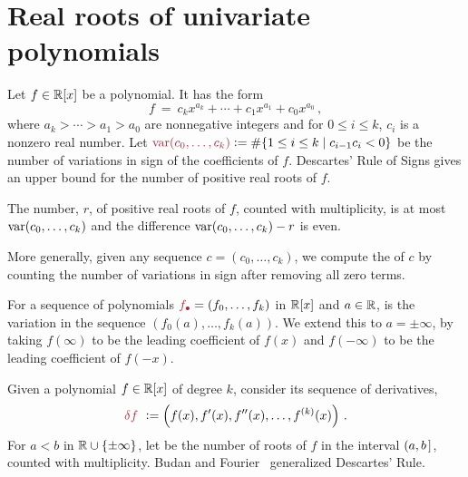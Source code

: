 
\section{Real roots of univariate polynomials}\label{S:one}

Let $f\in\mathbb{R}[x]$ be a polynomial.
It has the form
%
 \[
   f\ =\ c_kx^{a_k}  + \dotsb + c_{1}x^{a_{1}} + c_0x^{a_0}\,,
 \]
%
where $a_k> \dotsb > a_1 > a_0$ are nonnegative integers and for $0\leq i \leq k$, $c_{i}$ is a nonzero real number.
Let $\defcolor{\var(c_0,\dotsc,c_k)}\vcentcolon=\#\{1\leq i\leq k\mid c_{i-1}c_i<0\}$ be the number of variations in sign of the
coefficients of $f$.
Descartes' Rule of Signs \cite{So_Book} gives an upper bound for the number of positive real roots of $f$.

\begin{theorem}
  The number, $r$,  of positive real roots of $f$, counted with multiplicity, is at most $\operatorname{{\rm var}}(c_0,\dotsc,c_k)$ and the difference
  $\operatorname{{\rm var}}(c_0,\dotsc,c_k)-r$ is even.
\end{theorem}

More generally, given any sequence $c=(c_0,\dotsc,c_k)$, we compute the    of $c$ by counting the
number of variations in sign after removing all zero terms.
%
\begin{leftbar}

\end{leftbar}
%
For a sequence of polynomials  $\defcolor{f_\bullet}=(f_0,\dotsc,f_k)$ in $\mathbb{R}[x]$ and $a\in\mathbb{R}$,  is the
variation in the sequence 
$(f_0(a),\dotsc,f_{k}(a))$. 
We extend this to $a=\pm\infty$, by taking $f(\infty)$ to be the leading coefficient of $f(x)$ and $f(-\infty)$ to be the leading
coefficient of $f(-x)$.

Given a polynomial $f\in\mathbb{R}[x]$ of degree $k$, consider its sequence of derivatives,
%
 \[
   \defcolor{\delta f}\ \vcentcolon= \left(f(x),f'(x),f''(x),\dots,f^{(k)}(x)\right)\,.
 \]
%
For $a<b$ in $\mathbb{R}\cup\{\pm \infty\}$, let  be the number of roots of $f$ in the interval $(a,b\hspace{.05cm}]$, counted
with multiplicity.
Budan and Fourier~\cite[Ch.\ 2]{So_Book} generalized Descartes' Rule.

